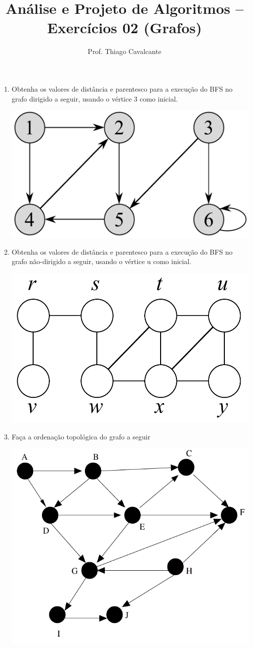 \documentclass[a4paper,11pt]{article}
\title{Análise e Projeto de Algoritmos -- Exercícios 02 (Grafos)}
\author{Prof. Thiago Cavalcante}
\date{}
\begin{document}
\maketitle

\sloppy
\raggedright

\setlength{\leftmargini}{0pt}
\begin{enumerate}
  \item Obtenha os valores de distância e parentesco para a execução do BFS no grafo dirigido a seguir, usando o vértice 3 como inicial.

  \begin{center}
    \includegraphics[width=.5\textwidth]{graph2.png}
  \end{center}

  \item Obtenha os valores de distância e parentesco para a execução do BFS no grafo não-dirigido a seguir, usando o vértice u como inicial.

  \begin{center}
    \includegraphics[width=.5\textwidth]{graph3.png}
  \end{center}

  \item Faça a ordenação topológica do grafo a seguir
  \bigskip

  \begin{center}
    \includegraphics[width=.5\textwidth]{graph1.png}
  \end{center}
\end{enumerate}
\end{document}
